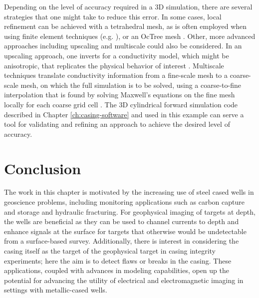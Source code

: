Depending on the level of accuracy required in a 3D simulation, there are several strategies that one might take to reduce this error. In some cases, local refinement can be achieved with a tetrahedral mesh, as is often employed when using finite element techniques (e.g. \cite{Weiss2016}), or an OcTree mesh \citep{Haber2007}. Other, more advanced approaches including upscaling and multiscale could also be considered. In an upscaling approach, one inverts for a conductivity model, which might be anisotropic, that replicates the physical behavior of interest \citep{Caudillo-Mata2017}. Multiscale techniques translate conductivity information from a fine-scale mesh to a coarse-scale mesh, on which the full simulation is to be solved, using a coarse-to-fine interpolation that is found by solving Maxwell’s equations on the fine mesh locally for each coarse grid cell \citep{Haber2014, Caudillo-Mata2017a}. The 3D cylindrical forward simulation code described in Chapter \ref{ch:casing-software} and used in this example can serve a tool for validating and refining an approach to achieve the desired level of accuracy.
\section{Conclusion}
The work in this chapter is motivated by the increasing use of steel cased wells in geoscience problems, including monitoring applications such as carbon capture and storage and hydraulic fracturing. For geophysical imaging of targets at depth, the wells are beneficial as they can be used to channel currents to depth and enhance signals at the surface for targets that otherwise would be undetectable from a surface-based survey. Additionally, there is interest in considering the casing itself as the target of the geophysical target in casing integrity experiments; here the aim is to detect flaws or breaks in the casing. These applications, coupled with advances in modeling capabilities, open up the potential for advancing the utility of electrical and electromagnetic imaging in settings with metallic-cased wells.

